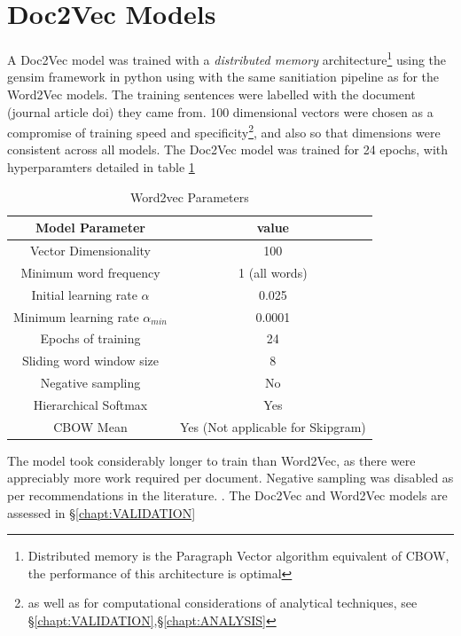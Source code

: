 \section{Doc2Vec Models}
A Doc2Vec model was trained with a \emph{distributed memory} architecture\footnote{Distributed memory is the Paragraph Vector algorithm equivalent of CBOW, the performance of this architecture is optimal\cite{doc2vec}} using the gensim framework in python \cite{gensim} using  with the same sanitiation pipeline as for the Word2Vec models. The training sentences were labelled with the document (journal article doi) they came from. 100 dimensional vectors were chosen as a compromise of training speed and specificity\footnote{as well as for computational considerations of analytical techniques, see \S\ref{chapt:VALIDATION},\S\ref{chapt:ANALYSIS}}, and also so that dimensions were consistent across all models. The Doc2Vec model was trained for 24 epochs, with hyperparamters detailed in table \ref{tab:doc2vechyperparams}
\begin{table}[H]
\begin{center}
\label{tab:doc2vechyperparams}
\caption{Word2vec Parameters}
\begin{tabular}{||c|c||}
\hline
Model Parameter & value\\
\hline
Vector Dimensionality & 100\\
Minimum word frequency & 1 (all words)\\
Initial learning rate $\alpha$ & 0.025 \\
Minimum learning rate $\alpha_{min}$&0.0001\\
Epochs of training & 24\\
Sliding word window size & 8\\
Negative sampling & No \\
Hierarchical Softmax & Yes\\
CBOW Mean & Yes (Not applicable for Skipgram) \\
\hline
\end{tabular}
\end{center}
\end{table}

The model took considerably longer to train than Word2Vec, as there were appreciably more work required per  document. Negative sampling was disabled as per recommendations in the literature. \cite{gensim} \cite{doc2vec}.
The Doc2Vec and Word2Vec models are assessed in  \S\ref{chapt:VALIDATION}
